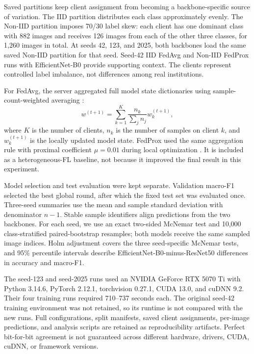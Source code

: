 \documentclass[conference]{IEEEtran}
\begin{document}
Saved partitions keep client assignment from becoming a backbone-specific source of variation. The IID partition distributes each class approximately evenly. The Non-IID partition imposes 70/30 label skew: each client has one dominant class with 882 images and receives 126 images from each of the other three classes, for 1,260 images in total. At seeds 42, 123, and 2025, both backbones load the same saved Non-IID partition for that seed. Seed-42 IID FedAvg and Non-IID FedProx runs with EfficientNet-B0 provide supporting context. The clients represent controlled label imbalance, not differences among real institutions.

For FedAvg, the server aggregated full model state dictionaries using sample-count-weighted averaging \cite{mcmahan2017fedavg}:
\begin{equation}
    w^{(t+1)} = \sum_{k=1}^{K} \frac{n_k}{\sum_j n_j} w_k^{(t+1)},
\end{equation}
where $K$ is the number of clients, $n_k$ is the number of samples on client $k$, and $w_k^{(t+1)}$ is the locally updated model state. FedProx used the same aggregation rule with proximal coefficient $\mu=0.01$ during local optimization \cite{li2020fedprox}. It is included as a heterogeneous-FL baseline, not because it improved the final result in this experiment.

Model selection and test evaluation were kept separate. Validation macro-F1 selected the best global round, after which the fixed test set was evaluated once. Three-seed summaries use the mean and sample standard deviation with denominator $n-1$. Stable sample identifiers align predictions from the two backbones. For each seed, we use an exact two-sided McNemar test and 10,000 class-stratified paired-bootstrap resamples; both models receive the same sampled image indices. Holm adjustment covers the three seed-specific McNemar tests, and 95\% percentile intervals describe EfficientNet-B0-minus-ResNet50 differences in accuracy and macro-F1.

The seed-123 and seed-2025 runs used an NVIDIA GeForce RTX 5070 Ti with Python 3.14.6, PyTorch 2.12.1, torchvision 0.27.1, CUDA 13.0, and cuDNN 9.2. Their four training runs required 710--737 seconds each. The original seed-42 training environment was not retained, so its runtime is not compared with the new runs. Full configurations, split manifests, saved client assignments, per-image predictions, and analysis scripts are retained as reproducibility artifacts. Perfect bit-for-bit agreement is not guaranteed across different hardware, drivers, CUDA, cuDNN, or framework versions.
\end{document}
